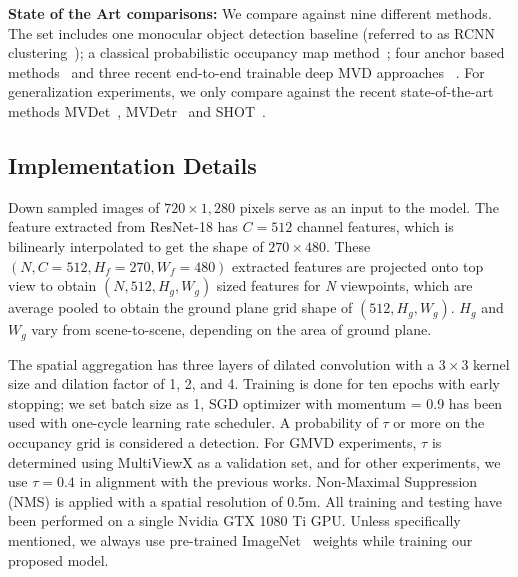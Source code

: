 \documentclass[letterpaper, 10 pt, conference]{ieeeconf}  \usepackage{times}
\newcommand{\sota}{state-of-the-art }
\begin{document}
\textbf{State of the Art comparisons:}
We compare against nine different methods. The set includes one monocular object detection baseline (referred to as RCNN clustering~\cite{xu2016multi}); a classical probabilistic occupancy map method~\cite{Fleuret2008MulticameraPT}; four anchor based methods~\cite{Lima2021GeneralizableM3,Baqu2017DeepOR,Chavdarova2017DeepMP,LpezCifuentes2018SemanticDM} and three recent end-to-end trainable deep MVD approaches ~\cite{hou2020multiview,hou2021multiview,song2021stacked}. For generalization experiments, we only compare against the recent \sota methods MVDet~\cite{hou2020multiview}, MVDetr~\cite{hou2021multiview} and SHOT~\cite{song2021stacked}.



\subsection{Implementation Details}

Down sampled images of $720 \times 1,280$ pixels serve as an input to the model. The feature extracted from ResNet-18 has $C=512$ channel features, which is bilinearly interpolated to get the shape of $270 \times 480$. These $(N,C=512,H_f=270,W_f=480)$ extracted features are projected onto top view to obtain $(N,512,H_g,W_g)$ sized features for {\it N} viewpoints, which are average pooled to obtain the ground plane grid shape of $(512,H_g,W_g)$. $H_g$ and $W_g$ vary from scene-to-scene, depending on the area of ground plane. 

The spatial aggregation has three layers of dilated convolution with a $3 \times 3$ kernel size and dilation factor of 1, 2, and 4. Training is done for ten epochs with early stopping; we set batch size as 1, SGD optimizer with momentum = 0.9 has been used with one-cycle learning rate scheduler. A probability of $\tau$ or more on the occupancy grid is considered a detection. For GMVD experiments, $\tau$ is determined using MultiViewX as a validation set, and for other experiments, we use $\tau = 0.4$ in alignment with the previous works. Non-Maximal Suppression (NMS) is applied with a spatial resolution of 0.5m. All training and testing have been performed on a single Nvidia GTX 1080 Ti GPU. Unless specifically mentioned, we always use pre-trained ImageNet~\cite{Deng2009ImageNetAL} weights while training our proposed model.
\end{document}
